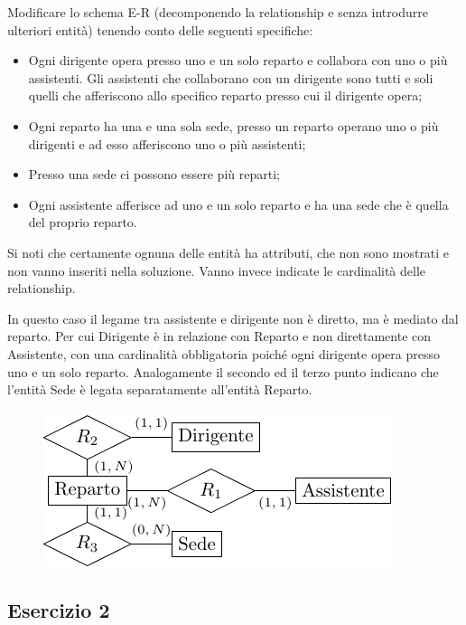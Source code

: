 \documentclass{article}
\numberwithin{equation}{subsection}
\begin{document}
Modificare lo schema E-R (decomponendo la relationship e senza introdurre ulteriori entità) tenendo conto delle
seguenti specifiche:

\begin{itemize}
    \item Ogni dirigente opera presso uno e un solo reparto e collabora con uno o più assistenti. Gli assistenti che
    collaborano con un dirigente sono tutti e soli quelli che afferiscono allo specifico reparto presso cui il
    dirigente opera;
    \item Ogni reparto ha una e una sola sede, presso un reparto operano uno o più dirigenti e ad esso afferiscono
    uno o più assistenti;
    \item Presso una sede ci possono essere più reparti;
    \item Ogni assistente afferisce ad uno e un solo reparto e ha una sede che è quella del proprio reparto. 
\end{itemize}

Si noti che certamente ognuna delle entità ha attributi, che non sono mostrati e non vanno inseriti nella soluzione.
Vanno invece indicate le cardinalità delle relationship.

In questo caso il legame tra assistente e dirigente non è diretto, ma è mediato dal reparto. Per cui Dirigente è in relazione con Reparto e non direttamente con Assistente, con una cardinalità obbligatoria poiché ogni dirigente opera presso uno e un solo reparto. Analogamente il secondo ed il terzo punto indicano che l'entità Sede è legata separatamente all'entità Reparto. 

\begin{figure}[H]%
    \centering%
    \includegraphics[scale=1.2]{schema_5_16-12-24.pdf}%
\end{figure}

\subsection{Esercizio 2}
\end{document}
